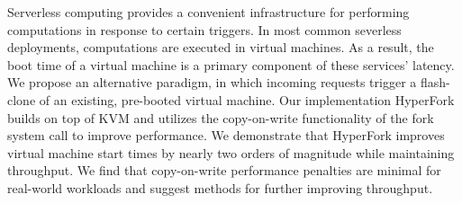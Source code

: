 
Serverless computing provides a convenient infrastructure for performing
computations in response to certain triggers. In most common severless
deployments, computations are executed in virtual machines. As a result, the
boot time of a virtual machine is a primary component of these services'
latency. We propose an alternative paradigm, in which incoming requests trigger
a flash-clone of an existing, pre-booted virtual machine. Our implementation
HyperFork builds on top of KVM and utilizes the copy-on-write functionality of
the fork system call to improve performance. We demonstrate that HyperFork
improves virtual machine start times by nearly two orders of magnitude while
maintaining throughput. We find that copy-on-write performance penalties are
minimal for real-world workloads and suggest methods for further improving
throughput.
